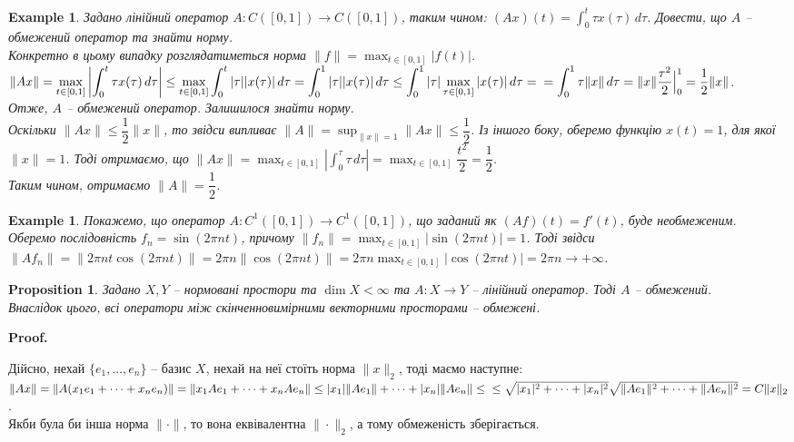 \documentclass[a4paper, 10pt]{article}
\makeatletter
\theoremstyle{theoremdd}
\theoremstyle{theoremdd}
\theoremstyle{theoremdd}
\theoremstyle{theoremdd}
\newtheorem{example}[theorem]{Example}
\theoremstyle{theoremdd}
\newtheorem{proposition}[theorem]{Proposition}
\theoremstyle{theoremdd}
\theoremstyle{theoremdd}
\theoremstyle{theoremdd}
\renewenvironment{proof}[1][Proof.\\]{\par
\pushQED{\hfill \qed}%
\normalfont \topsep6\p@\@plus6\p@\relax
\trivlist
\item\relax
{\bfseries
#1\@addpunct{.}}\hspace\labelsep\ignorespaces
}{%
\popQED\endtrivlist\@endpefalse
}
\makeatother
\begin{document}
\begin{example}
Задано лінійний оператор $A \colon C([0,1]) \to C([0,1])$, таким чином: $(Ax)(t) = \displaystyle\int_0^t \tau x(\tau)\,d\tau$. Довести, що $A$ -- обмежений оператор та знайти норму.\\
Конкретно в цьому випадку розглядатиметься норма $\|f\| = \displaystyle\max_{t \in [0,1]} |f(t)|$.\\
$\displaystyle\|Ax\| = \max_{t \in [0,1]} \left| \int_0^t \tau x(\tau)\,d\tau \right| \leq \max_{t \in [0,1]} \int_0^t |\tau| |x(\tau)|\,d\tau = \int_0^1 |\tau| |x(\tau)|\,d\tau \leq \int_0^1 |\tau| \max_{\tau \in [0,1]} |x(\tau)|\,d\tau = \\
= \int_0^1 \tau \|x \|\,d\tau = \|x\| \dfrac{\tau^2}{2} \Big|_0^1 = \dfrac{1}{2} \|x\|$.\\
Отже, $A$ -- обмежений оператор. Залишилося знайти норму.\\
Оскільки $\|Ax\| \leq \dfrac{1}{2} \|x\|$, то звідси випливає $\|A\| = \displaystyle\sup_{\|x\| = 1} \|Ax\| \leq \dfrac{1}{2}$. Із іншого боку, оберемо функцію $x(t) = 1$, для якої $\|x\| = 1$. Тоді отримаємо, що $\|Ax\| = \displaystyle\max_{t \in [0,1]} \left|\int_0^\tau \tau\,d\tau\right| = \max_{t \in [0,1]} \dfrac{t^2}{2} = \dfrac{1}{2}$.\\
Таким чином, отримаємо $\|A\| = \dfrac{1}{2}$.
\end{example}

\begin{example}
Покажемо, що оператор $A \colon C^1([0,1]) \to C^1([0,1])$, що заданий як $(Af)(t) = f'(t)$, буде необмеженим.\\
Оберемо послідовність $f_n = \sin (2\pi n t)$, причому $\|f_n\| = \displaystyle\max_{t \in [0,1]} |\sin (2\pi n t)| = 1$. Тоді звідси\\
$\|Af_n\| = \displaystyle \| 2\pi n t \cos (2\pi n t)\| = 2 \pi n \| \cos (2\pi n t)\| = 2 \pi n \max_{t \in [0,1]} |\cos (2\pi n t)| = 2 \pi n \to +\infty$.
\end{example}

\begin{proposition}
Задано $X,Y$ -- нормовані простори та $\dim X < \infty$ та $A \colon X \to Y$ -- лінійний оператор. Тоді $A$ -- обмежений.\\
Внаслідок цього, всі оператори між скінченновимірними векторними просторами -- обмежені.
\end{proposition}

\begin{proof}
Дійсно, нехай $\{e_1,\dots,e_n\}$ -- базис $X$, нехай на неї стоїть норма $\|x\|_2$, тоді маємо наступне:\\
$\|Ax\| = \|A (x_1 e_1 + \dots + x_n e_n) \| = \| x_1 A e_1 + \dots + x_n A e_n \| \leq |x_1| \|A e_1 \| + \dots + |x_n| \|A e_n \| \leq \\
\leq \sqrt{|x_1|^2 + \dots + |x_n|^2} \sqrt{\|Ae_1\|^2 + \dots + \|Ae_n\|^2} = C \|x\|_2$.\\
Якби була би інша норма $\| \cdot \|$, то вона еквівалентна $\| \cdot \|_2$, а тому обмеженість зберігається.
\end{proof}
\end{document}
